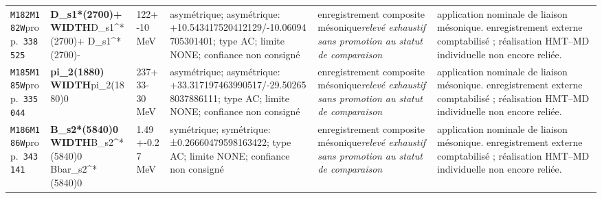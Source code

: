 \begin{landscape}
\begin{longtable}{L{1.85cm}L{4.45cm}L{2.35cm}L{4.05cm}L{3.35cm}L{7.15cm}}
\texttt{M182}\newline \texttt{M182W}\newline prop.\ \texttt{338525} & \textbf{D\_\allowbreak{}s1*(2700)+ WIDTH}\newline D\_\allowbreak{}s1\textasciicircum{}*(2700)+ \textbar{}\allowbreak{} D\_\allowbreak{}s1\textasciicircum{}*(2700)- & 122+-10\,MeV & asymétrique; asymétrique: +10.543417520412129/-10.06094705301401; type AC; limite NONE; confiance non consigné & enregistrement composite mésonique\newline \emph{relevé exhaustif sans promotion au statut de comparaison} & application nominale de liaison mésonique. enregistrement externe comptabilisé ; réalisation HMT--MD individuelle non encore reliée. \\
\texttt{M185}\newline \texttt{M185W}\newline prop.\ \texttt{335044} & \textbf{pi\_\allowbreak{}2(1880) WIDTH}\newline pi\_\allowbreak{}2(1880)0 & 237+33-30\,MeV & asymétrique; asymétrique: +33.317197463990517/-29.502658037886111; type AC; limite NONE; confiance non consigné & enregistrement composite mésonique\newline \emph{relevé exhaustif sans promotion au statut de comparaison} & application nominale de liaison mésonique. enregistrement externe comptabilisé ; réalisation HMT--MD individuelle non encore reliée. \\
\texttt{M186}\newline \texttt{M186W}\newline prop.\ \texttt{343141} & \textbf{B\_\allowbreak{}s2*(5840)0 WIDTH}\newline B\_\allowbreak{}s2\textasciicircum{}*(5840)0 \textbar{}\allowbreak{} Bbar\_\allowbreak{}s2\textasciicircum{}*(5840)0 & 1.49+-0.27\,MeV & symétrique; symétrique: ±0.26660479598163422; type AC; limite NONE; confiance non consigné & enregistrement composite mésonique\newline \emph{relevé exhaustif sans promotion au statut de comparaison} & application nominale de liaison mésonique. enregistrement externe comptabilisé ; réalisation HMT--MD individuelle non encore reliée. \\

\end{longtable}
\end{landscape}
